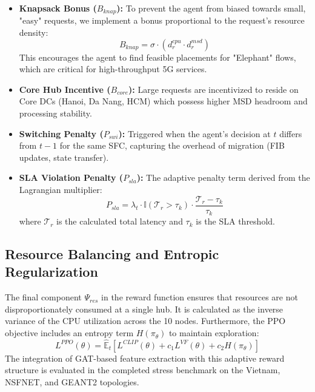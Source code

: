 \documentclass[12pt, a4paper, reqno, oneside]{book}
\begin{document}
\begin{itemize}
    \item \textbf{Knapsack Bonus ($B_{knap}$):} To prevent the agent from biased towards small, "easy" requests, we implement a bonus proportional to the request's resource density:
    \begin{equation}
    B_{knap} = \sigma \cdot \left( d_r^{cpu} \cdot d_r^{msd} \right)
    \end{equation}
    This encourages the agent to find feasible placements for "Elephant" flows, which are critical for high-throughput 5G services.
    \item \textbf{Core Hub Incentive ($B_{core}$):} Large requests are incentivized to reside on Core DCs (Hanoi, Da Nang, HCM) which possess higher MSD headroom and processing stability.
    \item \textbf{Switching Penalty ($P_{swi}$):} Triggered when the agent's decision at $t$ differs from $t-1$ for the same SFC, capturing the overhead of migration (FIB updates, state transfer).
    \item \textbf{SLA Violation Penalty ($P_{sla}$):} The adaptive penalty term derived from the Lagrangian multiplier:
    \begin{equation}
    P_{sla} = \lambda_t \cdot \mathbb{I}(\mathcal{T}_r > \tau_k) \cdot \frac{\mathcal{T}_r - \tau_k}{\tau_k}
    \end{equation}
    where $\mathcal{T}_r$ is the calculated total latency and $\tau_k$ is the SLA threshold.
\end{itemize}

\subsection{Resource Balancing and Entropic Regularization}
The final component $\Psi_{res}$ in the reward function ensures that resources are not disproportionately consumed at a single hub. It is calculated as the inverse variance of the CPU utilization across the 10 nodes. Furthermore, the PPO objective includes an entropy term $H(\pi_\theta)$ to maintain exploration:
\begin{equation}
L^{PPO}(\theta) = \hat{\mathbb{E}}_t [ L^{CLIP}(\theta) + c_1 L^{VF}(\theta) + c_2 H(\pi_\theta) ]
\end{equation}
The integration of GAT-based feature extraction with this adaptive reward structure is evaluated in the completed stress benchmark on the Vietnam, NSFNET, and GEANT2 topologies.
\end{document}
